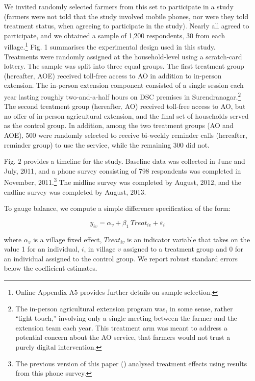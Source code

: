 \documentclass[12pt]{article}
\begin{document}
{\normalsize We invited randomly selected farmers from this set to
participate in a study (farmers were not told that the study involved mobile
phones, nor were they told treatment status, when agreeing to participate in
the study). Nearly all agreed to participate, and we obtained a sample of
1,200 respondents, 30 from each village.\footnote{Online Appendix A5 provides further details on sample selection.} Fig. 1 summarises the experimental
design used in this study. Treatments were randomly assigned at the
household-level using a scratch-card lottery. The sample was split into
three equal groups. The first treatment group (hereafter, AOE) received
toll-free access to AO in addition to in-person extension. The in-person
extension component consisted of a single session each year lasting roughly
two-and-a-half hours on DSC premises in Surendranagar.\footnote{The in-person agricultural extension program was, in some sense, rather “light touch,” involving only a single meeting between the farmer and the extension team each year. This treatment arm was meant to address a potential concern about the AO service, that farmers would not trust a purely digital intervention.} The second treatment group (hereafter, AO) received toll-free access to AO, but no offer of
in-person agricultural extension, and the final set of households served
as the control group. In addition, among the two treatment groups (AO and
AOE), 500 were randomly selected to receive bi-weekly reminder calls
(hereafter, reminder group) to use the service, while the remaining 300 did
not. }

{\normalsize Fig. 2 provides a timeline for the study. Baseline data was
collected in June and July, 2011, and a phone survey consisting of 798
respondents was completed in November, 2011.\footnote{%
The previous version of this paper (\citealp{cole2012value}) analysed
treatment effects using results from this phone survey.} The midline survey
was completed by August, 2012, and the endline survey was completed by
August, 2013. }

{\normalsize To gauge balance, we compute a
simple difference specification of the form: }

{\normalsize 
\begin{equation}
y_{iv}=\alpha_{v}+\beta_{1}\ Treat_{iv}+ \varepsilon_{i}  \label{sd1}
\end{equation}
}

{\normalsize where $\alpha _{v}$ is a village fixed effect, $Treat_{iv}$ is
an indicator variable that takes on the value 1 for an individual, $i$, in
village $v$ assigned to a treatment group and 0 for an individual assigned
to the control group. We report robust standard errors below the coefficient
estimates. }
\end{document}
